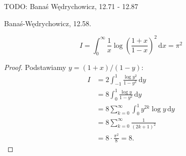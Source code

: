 TODO: Banaś Wędrychowicz, 12.71 - 12.87

\begin{integral}
    Banaś-Wędrychowicz, 12.58.
\end{integral}

\begin{integral}
    \begin{equation}
        I = \int_0^\infty \frac{1}{x} \log \left(\frac{1+x}{1-x}\right)^2 \,\mathrm{d}x = \pi^2
    \end{equation}
\end{integral}

\begin{proof}
    Podstawiamy $y = (1+x) / (1-y)$:
    \begin{align}
        I & = 2 \int_{-1}^1 \frac{\log y^2}{1-y^2} \,\mathrm{d}y \\
          & = 8 \int_0^1 \frac{\log y}{1-y^2} \, \mathrm{d}{y} \\
          & = 8 \sum_{k=0}^\infty \int_0^1 y^{2k} \log y \,\mathrm{d} y \\
          & = 8 \sum_{k=0}^\infty \frac{1}{(2k+1)^2} \\
          & = 8 \cdot \frac{\pi^2}{8} = 8.
    \end{align}
\end{proof}